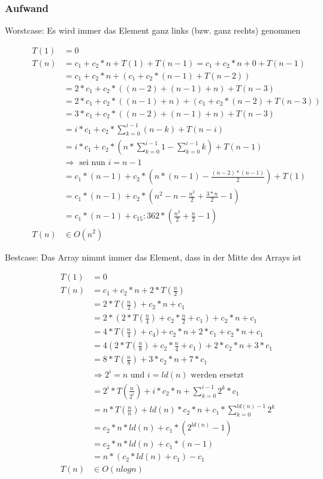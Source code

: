 \documentclass[a4paper,10pt]{article}
\newcommand{\T}[1]{\text{#1}} %
\newcommand{\Ra}{\Rightarrow}
\begin{document}
\subsubsection{Aufwand}
\begin{description}
	\item[Worstcase: Es wird immer das Element ganz links (bzw. ganz rechts) genommen]
	\begin{align*}
		T(1) &= 0\\
		T(n) &= c_1 + c_2 * n + T(1) + T(n-1)  = c_1 + c_2 * n + 0 + T(n-1) \\
		&= c_1 + c_2 * n + (c_1 + c_2 * (n - 1) + T(n - 2))\\ 
		&= 2 * c_1 + c_2 * ((n-2) + (n-1) + n) + T(n-3) \\
		&= 2 * c_1 + c_2 * ((n-1) + n) + (c_1 + c_2 * (n-2) + T(n-3))\\
		&= 3 * c_1 + c_2 * ( (n - 2) + (n - 1) + n) + T(n-3) \\
		&= i * c_1 + c_2 * \sum_{k=0}^{i-1} (n-k) + T(n-i)\\ 
		&= i * c_1 + c_2 * (n * \sum_{k=0}^{i-1} 1 - \sum_{k=0}^{i-1} k) + T(n-1)\\
		&\Ra \T{ sei nun }i=n-1\\
		&= c_1 * (n-1) + c_2 * (n * (n-1) - \frac{(n-2) * (n-1)}{2}) + T(1) \\
		&= c_1 * (n-1) + c_2 * (n^2-n-\frac{n^2}{2} + \frac{3*n}{2} -1) \\
		&= c_1 * (n-1) + c_15:362 * (\frac{n^2}{2} + \frac{n}{2} -1) \\
		T(n) &\in O(n^2)
	\end{align*}
	\item[Bestcase: Das Array nimmt immer das Element, dass in der Mitte des Arrays ist]
	\begin{align*}
		T(1) &= 0 \\
		T(n) &= c_1 + c_2 * n + 2 * T(\frac{n}{2}) \\
		&= 2 * T(\frac{n}{2}) + c_2 * n + c_1 \\
		&= 2 *(2 * T(\frac{n}{4})+c_2*\frac{n}{2} + c_1) + c_2 * n + c_1\\ 
		&= 4  * T(\frac{n}{4}) + c_4) + c_2 * n + 2 * c_1 + c_2 * n + c_1 \\
		&= 4 ( 2* T(\frac{n}{8}) + c_2 * \frac{n}{4} + c_1) + 2 * c_2*n+3*c_1\\
		&=8*T(\frac{n}{8}) + 3 *c_2 * n + 7* c_1\\
		&\Ra 2^i=n \T{ und } i=ld(n) \T{ werden ersetzt}\\
		&=2^i * T(\frac{n}{2^i}) + i * c_2 * n + \sum_{k=0}^{i-1} 2^k*c_1 \\
		&= n* T(\frac{n}{n}) +ld(n)*c_2*n+ c_1 * \sum_{k=0}^{ld(n)-1} 2^k \\
		&=c_2 * n * ld(n) + c_1 *(2^{ld(n)} -1) \\
		&=c_2 * n * ld(n) + c_1 * (n-1) \\
		&= n * (c_2 * ld(n) + c_1) - c_1  \\
		T(n) &\in O( n log n)
	\end{align*}
\end{description}
\end{document}
